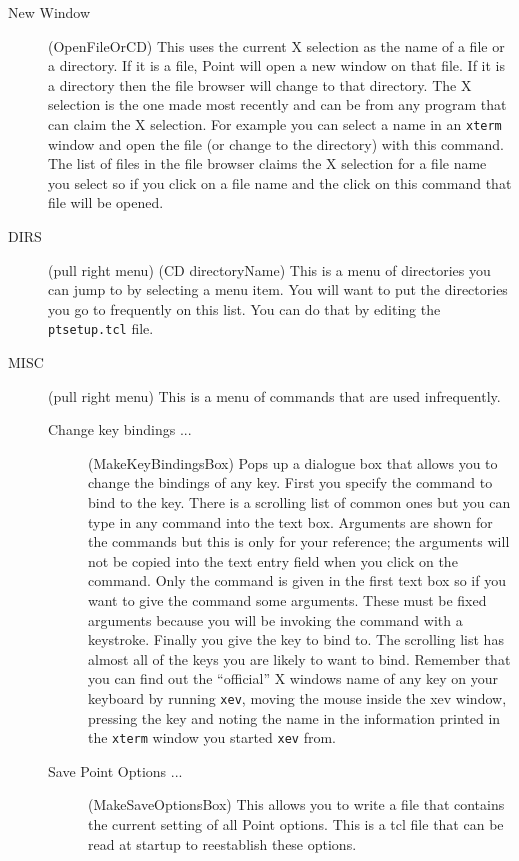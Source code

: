 \begin{description}
\item[New Window] (OpenFileOrCD)
This uses the current X selection as the name of a file or a directory.
If it is a file, Point will open a new window on that file.
If it is a directory then the file browser will change to that directory.
The X selection is the one made most recently and can be
from any program that can claim the X selection.
For example you can select a name in an {\tt xterm} window
and open the file (or change to the directory) with this command.
The list of files in the file browser claims the X selection for
a file name you select so if you click on a file name and
the click on this command that file will be opened.

\item[DIRS] (pull right menu) (CD directoryName)
This is a menu of directories you can jump to by selecting a menu item.
You will want to put the directories you go to frequently
on this list.
You can do that by editing the {\tt ptsetup.tcl} file.

\item[MISC] (pull right menu)
This is a menu of commands that are used  infrequently.
	\begin{description}

	\item[Change key bindings ...] (MakeKeyBindingsBox)
	Pops up a dialogue box that allows you to change the
	bindings of any key.
	First you specify the command to bind to the key.
	There is a scrolling list of common ones but you can type
	in any command into the text box.
	Arguments are shown for the commands but this is only for
	your reference; the arguments will not be copied into
	the text entry field when you click on the command.
	Only the command is given in the first text box so if you
	want to give the command some arguments.
	These must be fixed arguments because you will be invoking the
	command with a keystroke.
	Finally you give the key to bind to.
	The scrolling list has almost all of the keys you are likely to
	want to bind.
	Remember that you can find out the ``official'' X windows
	name of any key on your keyboard by running {\tt xev}, moving
	the mouse inside the xev window, pressing the key and noting
	the name in the information printed in the {\tt xterm} window you
	started {\tt xev} from.

	\item[Save Point Options ...] (MakeSaveOptionsBox)
	This allows you to write a file that contains the current
	setting of all Point options.
	This is a tcl file that can be read at startup to reestablish
	these options.


\end{description}
\end{description}
